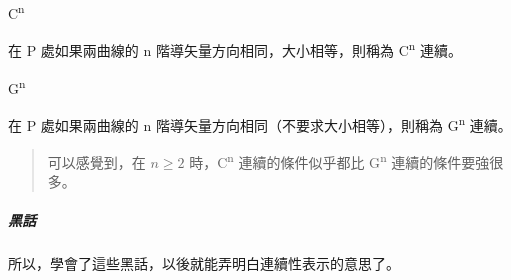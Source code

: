 \documentclass[
]{article}
\begin{document}
C\textsuperscript{n}

在 P 處如果兩曲線的 n 階導矢量方向相同，大小相等，則稱為
C\textsuperscript{n} 連續。

G\textsuperscript{n}

在 P 處如果兩曲線的 n 階導矢量方向相同（不要求大小相等），則稱為
G\textsuperscript{n} 連續。

\begin{quote}
可以感覺到，在 \(n \ge 2\) 時，C\textsuperscript{n} 連續的條件似乎都比
G\textsuperscript{n} 連續的條件要強很多。
\end{quote}

\hypertarget{header-n205}{%
\subparagraph{黑話}\label{header-n205}}

所以，學會了這些黑話，以後就能弄明白連續性表示的意思了。
\end{document}

